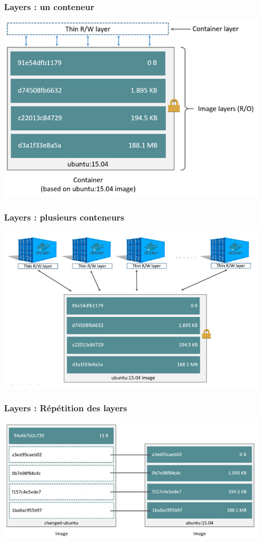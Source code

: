   \begin{frame}
    \frametitle{Layers : un conteneur}
    \includegraphics[width=\linewidth,height=\textheight]{images/docker/container-layers.jpg}
  \end{frame}

 \begin{frame}
    \frametitle{Layers : plusieurs conteneurs}
    \includegraphics[width=\linewidth,height=\textheight]{images/docker/sharing-layers.jpg}
  \end{frame}

 \begin{frame}
    \frametitle{Layers : Répétition des layers}
    \includegraphics[width=\linewidth,height=\textheight]{images/docker/saving-space.jpg}
  \end{frame}

